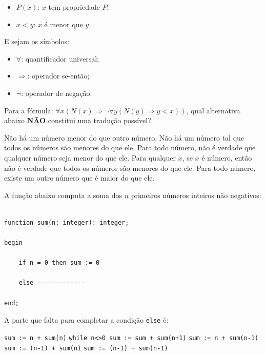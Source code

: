 \documentclass[12pt, addpoints]{exam}
\begin{document}
\begin{questions}
\begin{itemize}
    \item \( P(x) \): \( x \) tem propriedade \( P \);

    \item \( x < y \): \( x \) é menor que \( y \).

\end{itemize}



E sejam os símbolos:

\begin{itemize}

    \item \( \forall \): quantificador universal;

    \item \( \Rightarrow \): operador se-então;

    \item \( \neg \): operador de negação.

\end{itemize}



Para a fórmula: \( \forall x (N(x) \Rightarrow \neg \forall y (N(y) \Rightarrow y < x)) \), qual alternativa abaixo \textbf{NÃO} constitui uma tradução possível?


\begin{choices}
\choice Não há um número menor do que outro número.
\choice Não há um número tal que todos os números são menores do que ele.
\choice Para todo número, não é verdade que qualquer número seja menor do que ele.
\choice Para qualquer \( x \), se \( x \) é número, então não é verdade que todos os números são menores do que ele.
\choice Para todo número, existe um outro número que é maior do que ele.
\end{choices}

\question

A função abaixo computa a soma dos \( n \) primeiros números inteiros não negativos:



\begin{verbatim}

function sum(n: integer): integer;

begin

    if n = 0 then sum := 0

    else -------------

end;

\end{verbatim}



A parte que falta para completar a condição \texttt{else} é:
\begin{choices}
\choice \texttt{sum := n + sum(n)}
\choice \texttt{while n<>0 sum := sum + sum(n+1)}
\choice \texttt{sum := n + sum(n-1)}
\choice \texttt{sum := (n-1) + sum(n)}
\choice \texttt{sum := (n-1) + sum(n-1)}
\end{choices}


\end{questions}
\end{document}
